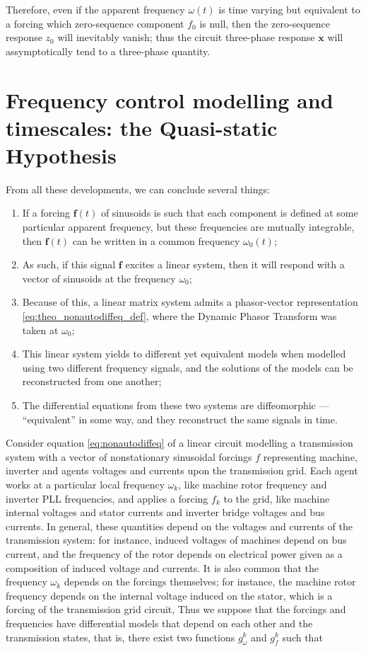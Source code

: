 	Therefore, even if the apparent frequency $\omega(t)$ is time varying but equivalent to a forcing which zero-sequence component $f_0$ is null, then the zero-sequence response $z_0$ will inevitably vanish; thus the circuit three-phase response $\mathbf{x}$ will assymptotically tend to a three-phase quantity.

\section{Frequency control modelling and timescales: the Quasi-static Hypothesis}\label{sec:freq_modelling_timescales} %

	From all these developments, we can conclude several things:

\begin{enumerate}
	\item If a forcing $\mathbf{f}(t)$ of sinusoids is such that each component is defined at some particular apparent frequency, but these frequencies are mutually integrable, then $\mathbf{f}(t)$ can be written in a common frequency $\omega_0(t)$;
	\item As such, if this signal $\mathbf{f}$ excites a linear system, then it will respond with a vector of sinusoids at the frequency $\omega_0$;
	\item Because of this, a linear matrix system admits a phasor-vector representation \eqref{eq:theo_nonautodiffeq_def}, where the Dynamic Phasor Transform was taken at $\omega_0$;
	\item This linear system yields to different yet equivalent models when modelled using two different frequency signals, and the solutions of the models can be reconstructed from one another;
	\item The differential equations from these two systems are diffeomorphic — ``equivalent'' in some way, and they reconstruct the same signals in time.
\end{enumerate}

	Consider equation \eqref{eq:nonautodiffeq} of a linear circuit modelling a transmission system with a vector of nonstationary sinusoidal forcings $f$ representing machine, inverter and agents voltages and currents upon the transmission grid. Each agent works at a particular local frequency $\omega_k$, like machine rotor frequency and inverter PLL frequencies, and applies a forcing $f_k$ to the grid, like machine internal voltages and stator currents and inverter bridge voltages and bus currents. In general, these quantities depend on the voltages and currents of the transmission system: for instance, induced voltages of machines depend on bus current, and the frequency of the rotor depends on electrical power given as a composition of induced voltage and currents. It is also common that the frequency $\omega_k$ depends on the forcings themselves; for instance, the machine rotor frequency depends on the internal voltage induced on the stator, which is a forcing of the transmission grid circuit, Thus we suppose that the forcings and frequencies have differential models that depend on each other and the transmission states, that is, there exist two functions $g_\omega^k$ and $g_f^k$ such that


